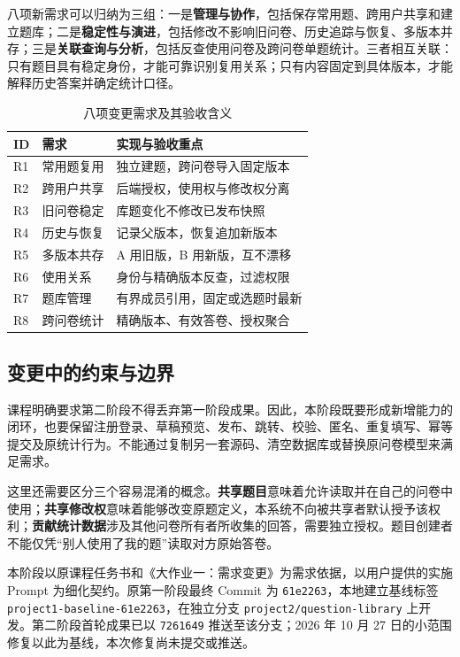 \documentclass[UTF8,10pt,a4paper,twocolumn,fontset=none]{ctexart}
\newcommand{\term}[1]{\textbf{#1}}
\begin{document}
八项新需求可以归纳为三组：一是\term{管理与协作}，包括保存常用题、跨用户共享和建立题库；二是\term{稳定性与演进}，包括修改不影响旧问卷、历史追踪与恢复、多版本并存；三是\term{关联查询与分析}，包括反查使用问卷及跨问卷单题统计。三者相互关联：只有题目具有稳定身份，才能可靠识别复用关系；只有内容固定到具体版本，才能解释历史答案并确定统计口径。

\begin{table}[t]
\centering\small
\caption{八项变更需求及其验收含义}
\label{tab:requirements}
\begin{tabularx}{\columnwidth}{@{}p{5mm}p{25mm}Y@{}}
\toprule ID & 需求 & 实现与验收重点\\\midrule
R1 & 常用题复用 & 独立建题，跨问卷导入固定版本\\
R2 & 跨用户共享 & 后端授权，使用权与修改权分离\\
R3 & 旧问卷稳定 & 库题变化不修改已发布快照\\
R4 & 历史与恢复 & 记录父版本，恢复追加新版本\\
R5 & 多版本共存 & A 用旧版，B 用新版，互不漂移\\
R6 & 使用关系 & 身份与精确版本反查，过滤权限\\
R7 & 题库管理 & 有界成员引用，固定或选题时最新\\
R8 & 跨问卷统计 & 精确版本、有效答卷、授权聚合\\
\bottomrule
\end{tabularx}
\end{table}

\subsection{变更中的约束与边界}
课程明确要求第二阶段不得丢弃第一阶段成果。因此，本阶段既要形成新增能力的闭环，也要保留注册登录、草稿预览、发布、跳转、校验、匿名、重复填写、幂等提交及原统计行为。不能通过复制另一套源码、清空数据库或替换原问卷模型来满足需求。

这里还需要区分三个容易混淆的概念。\term{共享题目}意味着允许读取并在自己的问卷中使用；\term{共享修改权}意味着能够改变原题定义，本系统不向被共享者默认授予该权利；\term{贡献统计数据}涉及其他问卷所有者所收集的回答，需要独立授权。题目创建者不能仅凭“别人使用了我的题”读取对方原始答卷。

本阶段以原课程任务书和《大作业一：需求变更》为需求依据，以用户提供的实施 Prompt 为细化契约。原第一阶段最终 Commit 为 \texttt{61e2263}，本地建立基线标签 \texttt{project1-baseline-61e2263}，在独立分支 \texttt{project2/question-library} 上开发。第二阶段首轮成果已以 \texttt{7261649} 推送至该分支；2026 年 10 月 27 日的小范围修复以此为基线，本次修复尚未提交或推送。
\end{document}
